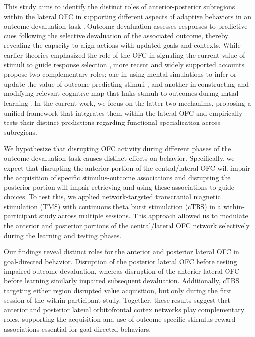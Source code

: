 \documentclass[lineno,sn-basic]{sn-jnl}%
\begin{document}
This study aims to identify the distinct roles of anterior-posterior subregions within the lateral OFC in supporting different aspects of adaptive behaviors in an outcome devaluation task \citep{RN606,HowRey2020,RN645,RN646,RN652,RN530,RN562,RN561,RN632,RN18,RN168,RN647,RN648,RN649}. Outcome devaluation assesses responses to predictive cues following the selective devaluation of the associated outcome, thereby revealing the capacity to align actions with updated goals and contexts. While earlier theories emphasized the role of the OFC in signaling the current value of stimuli to guide response selection \citep{RN652}, more recent and widely supported accounts propose two complementary roles: one in using mental simulations to infer or update the value of outcome-predicting stimuli \citep{RN606,RN530,HowRey2020}, and another in constructing and modifying relevant cognitive map that links stimuli to outcomes during initial learning \citep{RN598}. In the current work, we focus on the latter two mechanims, proposing a unified framework that integrates them within the lateral OFC and empirically tests their distinct predictions regarding functional specialization across subregions.


We hypothesize that disrupting OFC activity during different phases of the outcome devaluation task causes distinct effects on behavior. Specifically, we expect that disrupting the anterior portion of the central/lateral OFC will impair the acquisition of specific stimulus-outcome associations and disrupting the posterior portion will impair retrieving and using these associations to guide choices. To test this, we applied network-targeted transcranial magnetic stimulation (TMS) with continuous theta burst stimulation (cTBS) in a within-participant study across multiple sessions. This approach allowed us to modulate the anterior and posterior portions of the central/lateral OFC network selectively during the learning and testing phases. 

Our findings reveal distinct roles for the anterior and posterior lateral OFC in goal-directed behavior. Disruption of the posterior lateral OFC before testing impaired outcome devaluation, whereas
disruption of the anterior lateral OFC before learning similarly impaired subsequent devaluation. Additionally, cTBS targeting either region disrupted value acquisition, but only during the first session of the within-participant study. Together, these results suggest that anterior and posterior lateral orbitofrontal cortex networks play complementary roles, supporting the acquisition and use of
outcome-specific stimulus-reward associations essential for goal-directed behaviors.
\end{document}
